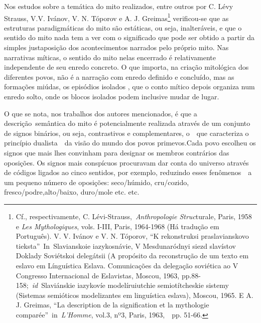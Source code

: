 Nos estudos sobre a temática do mito realizados, entre outros por C.
Lévy Strauss, V.V. Ivánov, V. N. Tóporov e A. J. Greimas\footnote{Cf.,
  respectivamente, C. Lévi-Strauss,~\emph{Anthropologie Struc}turale,
  Paris, 1958 e \emph{Les Mythologiques}, vols. I-III, Paris, 1964-1968
  (Há tradução em Português). V. V. Ivánov e V. N. Tóporov, ``K
  rekonstruksi praslavianskovo tieksta''~In~Slavianskoie iazykosnávie, V
  Mesdunaródnyi siezd slavístov Doklady Soviétskoi delegátsii (A
  propósito da reconstrução de um texto em eslavo em Línguística Eslava.
  Comunicações da delegação soviética ao V Congresso Internacional de
  Eslavistas, Moscou, 1963, pp.88-158;~\emph{id}~Slaviánskie iazykovíe
  modelíruiutchie semiotítcheskie sistemy (Sistemas semióticos
  modelizantes em linguística eslava), Moscou, 1965. E A. J. Greimas,
  ``La description de la signification et la mythologie
  comparée''~in~\emph{L'Homme}, vol.3, nº3, Paris, 1963,~~pp. 51-66.}
verificou-se que as estruturas paradigmáticas do mito são estáticas, ou
seja, inalteráveis, e que o sentido do mito nada tem a ver com o
significado que pode ser obtido a partir da simples justaposição dos
acontecimentos narrados pelo próprio mito. Nas narrativas míticas, o
sentido do mito nelas encerrado é relativamente independente de seu
enredo concreto. O que importa, na criação mitológica dos diferentes
povos, não é a narração com enredo definido e concluído, mas as
formações miúdas, os episódios isolados , que o conto mítico depois
organiza num enredo solto, onde os blocos isolados podem inclusive mudar
de lugar.

O que se nota, nos trabalhos dos autores mencionados, é que a
descrição~semântica do mito é potencialmente realizada através de um
conjunto de signos binários, ou seja, contrastivos e complementares,
o~~que caracteriza o princípio dualista~~da visão do mundo dos povos
primevos.Cada povo escolheu os signos que mais lhes convinham para
designar os membros contrários das oposições. Os signos mais conspícuos
procuravam dar conta do universo através de códigos ligados ao cinco
sentidos, por exemplo, reduzindo esses fenômenos~~a um pequeno número de
oposições: seco/húmido, cru/cozido, fresco/podre,alto/baixo, duro/mole
etc. etc.

